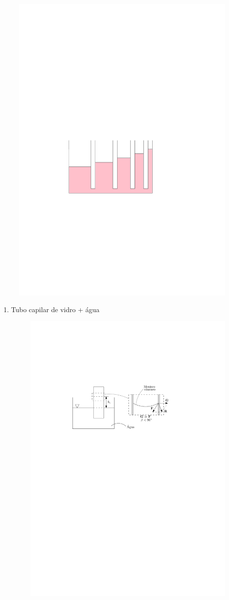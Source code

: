 \documentclass[
	a4paper, 
	12pt, 
	brazilian
]{article}
\begin{document}
\begin{itemize}
		\begin{figure}[H]
			\centering
			\includegraphics[width=0.5\linewidth]{assets/images/capilaridade}
			\label{fig:capilaridade}
		\end{figure}
		\begin{enumerate}
			\item Tubo capilar de vidro + água
			\begin{figure}[H]
				\centering
				\includegraphics[width=0.8\linewidth]{assets/images/vidro_agua}

\end{figure}
\end{enumerate}
\end{itemize}
\end{document}
